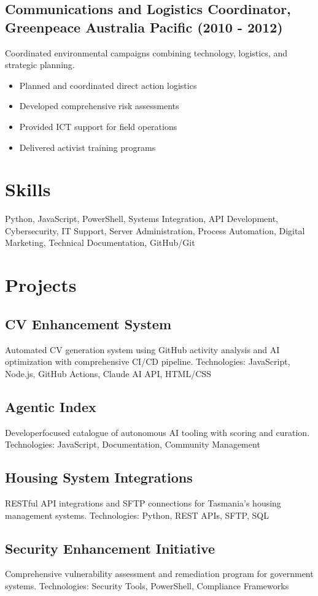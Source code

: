 \documentclass{article}
\begin{document}
\subsection*{Communications and Logistics Coordinator, Greenpeace Australia Pacific (2010 - 2012)}
Coordinated environmental campaigns combining technology, logistics, and strategic planning.
\begin{itemize}
    \item Planned and coordinated direct action logistics
    \item Developed comprehensive risk assessments
    \item Provided ICT support for field operations
    \item Delivered activist training programs
\end{itemize}

\section*{Skills}
Python, JavaScript, PowerShell, Systems Integration, API Development, Cybersecurity, IT Support, Server Administration, Process Automation, Digital Marketing, Technical Documentation, GitHub/Git

\section*{Projects}
\subsection*{CV Enhancement System}
Automated CV generation system using GitHub activity analysis and AI optimization with comprehensive CI/CD pipeline.
Technologies: JavaScript, Node.js, GitHub Actions, Claude AI API, HTML/CSS

\subsection*{Agentic Index}
Developerfocused catalogue of autonomous AI tooling with scoring and curation.
Technologies: JavaScript, Documentation, Community Management

\subsection*{Housing System Integrations}
RESTful API integrations and SFTP connections for Tasmania's housing management systems.
Technologies: Python, REST APIs, SFTP, SQL

\subsection*{Security Enhancement Initiative}
Comprehensive vulnerability assessment and remediation program for government systems.
Technologies: Security Tools, PowerShell, Compliance Frameworks
\end{document}
